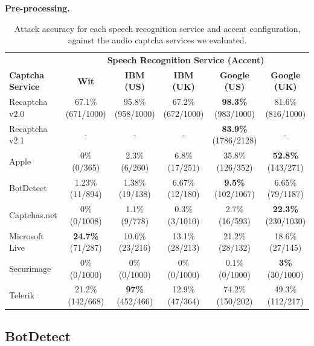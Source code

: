 \textbf{Pre-processing.}
\begin{table}[t]
\centering
\caption{Attack accuracy for each speech recognition service and accent configuration, against the audio captcha services we evaluated.}
\begin{tabular}{lccccc}
\toprule
&\multicolumn{5}{c}{\textbf{Speech Recognition Service (Accent)}}\\
\cmidrule{2-6}
\textbf{Captcha Service}& \textbf{Wit}& \textbf{IBM (US)} & \textbf{ IBM (UK)} & \textbf{Google (US)} & \textbf{Google (UK)} \\
\hline
Recaptcha v2.0 & 67.1\% (671/1000) & 95.8\% (958/1000) & 67.2\% (672/1000) & \textbf{98.3\%} (983/1000) & 81.6\% (816/1000) \\
\rowcolor{Gray}
Recaptcha v2.1 & -  & - & -  & \textbf{83.9\%} (1786/2128) & - \\
Apple  & 0\% (0/365)  & 2.3\% (6/260) & 6.8\% (17/251) & 35.8\% (126/352) & \textbf{52.8\%} (143/271) \\
\rowcolor{Gray}
BotDetect  & 1.23\% (11/894)  & 1.38\% (19/138) & 6.67\% (12/180) & \textbf{9.5\%} (102/1067)  & 6.65\% (79/1187) \\
Captchas.net  & 0\% (0/1008) & 1.1\% (9/778)  & 0.3\% (3/1010)  & 2.7\% (16/593) & \textbf{22.3\%} (230/1030) \\
\rowcolor{Gray}
Microsoft Live & \textbf{24.7\%} (71/287) & 10.6\% (23/216)  & 13.1\% (28/213)  & 21.2\% (28/132)  & 18.6\% (27/145) \\
Securimage  & 0\% (0/1000)  & 0\% (0/1000) & 0\% (0/1000) & 0.1\% (0/1000) & \textbf{3\%} (30/1000) \\
\rowcolor{Gray}
Telerik  & 21.2\% (142/668)  & \textbf{97\%} (452/466) & 12.9\% (47/364) & 74.2\% (150/202) & 49.3\% (112/217) \\
\bottomrule
\end{tabular}
\label{tab:combinations}
\end{table}


\subsection{BotDetect}

